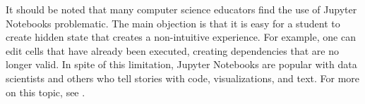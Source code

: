 \documentclass[acmsmall,screen,authorversion]{acmart}
\begin{document}
It should be noted that many computer science educators find the use
of Jupyter Notebooks problematic. The main objection is that it is
easy for a student to create hidden state that creates a non-intuitive
experience. For example, one can edit cells that have already been
executed, creating dependencies that are no longer valid. In spite of
this limitation, Jupyter Notebooks are popular with data scientists
and others who tell stories with code, visualizations, and text. For
more on this topic, see \cite{Calico2}.



\end{document}
